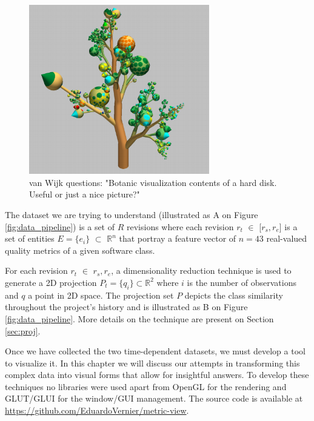 \begin{figure}[h]
	\centering
	\includegraphics[width=0.7\textwidth]{figures/botanic.png}
	\caption {van Wijk questions: "Botanic visualization contents of a hard disk. Useful or just a nice picture?"}
	\label{fig:botanic}
\end{figure}

The dataset we are trying to understand (illustrated as A on Figure \ref{fig:data_pipeline}) is a set of $R$ revisions where each revision $r_{t}$ $\in$ [$r_{s}, r_{e}$] \hspace{0.2cm}is a set of entities $E = \{ e_{i}\}$ $\subset$ $\mathbb{R}^{n}$ that portray a feature vector of $n = 43$ real-valued quality metrics of a given software class.

For each revision $r_{t}$ $\in$ \lbrack  $r_{s}, r_{e}$\rbrack, a dimensionality reduction technique is used to generate a 2D projection $P_{t} = \{q_{i} \} \subset{\mathbb{R}^{2}}$ where $i$ is the number of observations and $q$ a point in 2D space. The projection set $P$ depicts the class similarity throughout the project's history and is illustrated as B on Figure \ref{fig:data_pipeline}. More details on the technique are present on Section \ref{sec:proj}.

Once we have collected the two time-dependent datasets, we must develop a tool to visualize it. In this chapter we will discuss our attempts in transforming this complex data into visual forms that allow for insightful answers. To develop these techniques no libraries were used apart from OpenGL for the rendering and GLUT/GLUI for the window/GUI management. The source code is available at \url{https://github.com/EduardoVernier/metric-view}.
